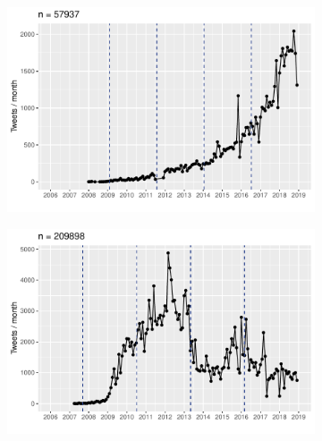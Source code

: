 \documentclass[
  a4paper,
  abstract=on,
  captions=tableabove
  ]{scrartcl}
\begin{document}
      \begin{figure}
        \caption[Temporal dynamics in absolute usage frequency]{Temporal dynamics in usage frequency for the selected neologisms.}
        \label{fig:freq-abs}
        \centering
        \begin{subfigure}{.3\linewidth}
          \caption{}
          \label{subfig:freq_temp_upskill}
          \includegraphics[width=\linewidth, height=.8\textheight, keepaspectratio]{"img/ui_upskill_time.pdf"}
        \end{subfigure}
        \hfill
        \begin{subfigure}{.3\linewidth}
          \caption{}
          \label{subfig:freq_temp_hyperlocal}
          \includegraphics[width=\linewidth, height=.8\textheight, keepaspectratio]{"img/ui_hyperlocal_time.pdf"}
        \end{subfigure}

\end{figure}
\end{document}
